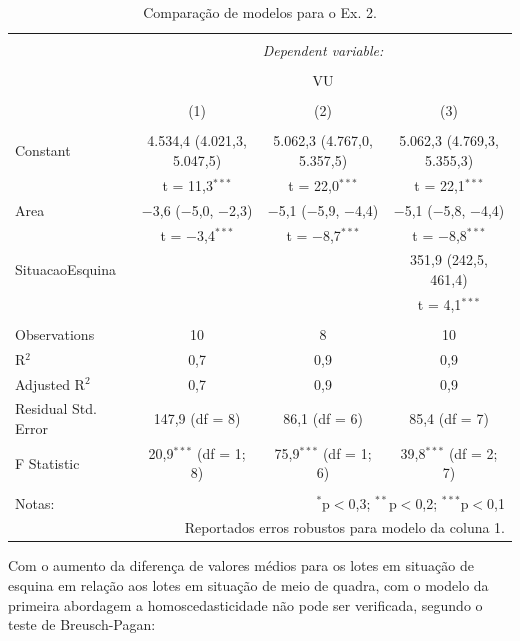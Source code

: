 \documentclass[
  a4paper, 11pt]{article}
\begin{document}
\begin{table}[H] \centering 
  \caption{Comparação de modelos para o Ex. 2.} 
  \label{tab:tab2} 
\footnotesize 
\begin{tabular}{@{\extracolsep{5pt}}lccc} 
\\[-1.8ex]\hline 
\hline \\[-1.8ex] 
 & \multicolumn{3}{c}{\textit{Dependent variable:}} \\ 
\cline{2-4} 
\\[-1.8ex] & \multicolumn{3}{c}{VU} \\ 
\\[-1.8ex] & (1) & (2) & (3)\\ 
\hline \\[-1.8ex] 
 Constant & 4.534,4 (4.021,3, 5.047,5) & 5.062,3 (4.767,0, 5.357,5) & 5.062,3 (4.769,3, 5.355,3) \\ 
  & t = 11,3$^{***}$ & t = 22,0$^{***}$ & t = 22,1$^{***}$ \\ 
  Area & $-$3,6 ($-$5,0, $-$2,3) & $-$5,1 ($-$5,9, $-$4,4) & $-$5,1 ($-$5,8, $-$4,4) \\ 
  & t = $-$3,4$^{***}$ & t = $-$8,7$^{***}$ & t = $-$8,8$^{***}$ \\ 
  SituacaoEsquina &  &  & 351,9 (242,5, 461,4) \\ 
  &  &  & t = 4,1$^{***}$ \\ 
 \hline \\[-1.8ex] 
Observations & 10 & 8 & 10 \\ 
R$^{2}$ & 0,7 & 0,9 & 0,9 \\ 
Adjusted R$^{2}$ & 0,7 & 0,9 & 0,9 \\ 
Residual Std. Error & 147,9 (df = 8) & 86,1 (df = 6) & 85,4 (df = 7) \\ 
F Statistic & 20,9$^{***}$ (df = 1; 8) & 75,9$^{***}$ (df = 1; 6) & 39,8$^{***}$ (df = 2; 7) \\ 
\hline 
\hline \\[-1.8ex] 
Notas: & \multicolumn{3}{r}{$^{*}$p$<$0,3; $^{**}$p$<$0,2; $^{***}$p$<$0,1} \\ 
 & \multicolumn{3}{r}{Reportados erros robustos para modelo da coluna 1.} \\ 
\end{tabular} 
\end{table}

Com o aumento da diferença de valores médios para os lotes em situação
de esquina em relação aos lotes em situação de meio de quadra, com o
modelo da primeira abordagem a homoscedasticidade não pode ser
verificada, segundo o teste de Breusch-Pagan:
\end{document}
